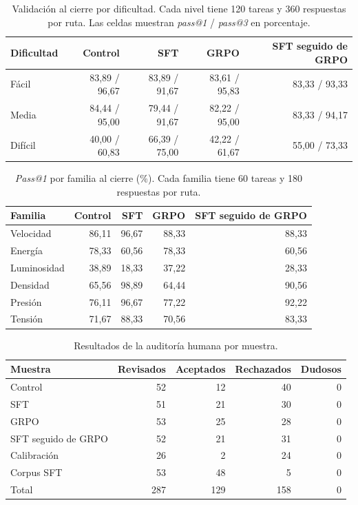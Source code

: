 \begin{table}[ht]
\centering
\caption{Validación al cierre por dificultad. Cada nivel tiene 120 tareas y
360 respuestas por ruta. Las celdas muestran \textit{pass@1} / \textit{pass@3}
en porcentaje.}
\begin{tabular}{lrrrr}
\toprule
Dificultad & Control & SFT & GRPO & SFT seguido de GRPO \\
\midrule
Fácil & 83,89 / 96,67 & 83,89 / 91,67 & 83,61 / 95,83 & 83,33 / 93,33 \\
Media & 84,44 / 95,00 & 79,44 / 91,67 & 82,22 / 95,00 & 83,33 / 94,17 \\
Difícil & 40,00 / 60,83 & 66,39 / 75,00 & 42,22 / 61,67 & 55,00 / 73,33 \\
\bottomrule
\end{tabular}
\end{table}

\begin{table}[ht]
\centering
\caption{\textit{Pass@1} por familia al cierre (\%). Cada familia tiene
60 tareas y 180 respuestas por ruta.}
\begin{tabular}{lrrrr}
\toprule
Familia & Control & SFT & GRPO & SFT seguido de GRPO \\
\midrule
Velocidad & 86,11 & 96,67 & 88,33 & 88,33 \\
Energía & 78,33 & 60,56 & 78,33 & 60,56 \\
Luminosidad & 38,89 & 18,33 & 37,22 & 28,33 \\
Densidad & 65,56 & 98,89 & 64,44 & 90,56 \\
Presión & 76,11 & 96,67 & 77,22 & 92,22 \\
Tensión & 71,67 & 88,33 & 70,56 & 83,33 \\
\bottomrule
\end{tabular}
\end{table}

\begin{table}[ht]
\centering
\caption{Resultados de la auditoría humana por muestra.}
\label{tab:auditoria}
\begin{tabular}{lrrrr}
\toprule
Muestra & Revisados & Aceptados & Rechazados & Dudosos \\
\midrule
Control & 52 & 12 & 40 & 0 \\
SFT & 51 & 21 & 30 & 0 \\
GRPO & 53 & 25 & 28 & 0 \\
SFT seguido de GRPO & 52 & 21 & 31 & 0 \\
Calibración & 26 & 2 & 24 & 0 \\
Corpus SFT & 53 & 48 & 5 & 0 \\
\midrule
Total & 287 & 129 & 158 & 0 \\
\bottomrule
\end{tabular}
\end{table}
